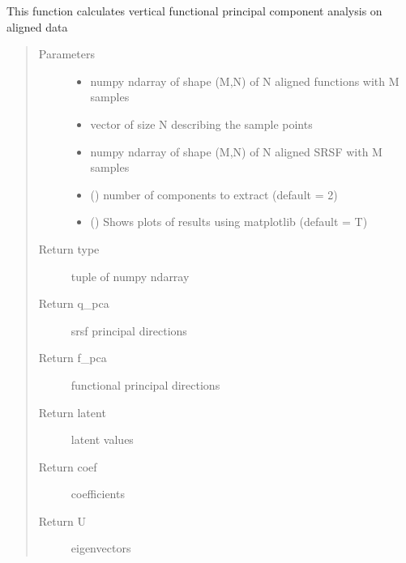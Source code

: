 \documentclass[letterpaper,10pt,english]{sphinxmanual}
\begin{document}

\begin{fulllineitems}
\label{\detokenize{fPCA:fPCA.vertfPCA}}
This function calculates vertical functional principal component analysis
on aligned data
\begin{quote}\begin{description}
\item[{Parameters}] \leavevmode\begin{itemize}
\item {} 
 \textendash{} numpy ndarray of shape (M,N) of N aligned functions with M
samples

\item {} 
 \textendash{} vector of size N describing the sample points

\item {} 
 \textendash{} numpy ndarray of shape (M,N) of N aligned SRSF with M samples

\item {} 
 () \textendash{} number of components to extract (default = 2)

\item {} 
 () \textendash{} Shows plots of results using matplotlib (default = T)

\end{itemize}

\item[{Return type}] \leavevmode
tuple of numpy ndarray

\item[{Return q\_pca}] \leavevmode
srsf principal directions

\item[{Return f\_pca}] \leavevmode
functional principal directions

\item[{Return latent}] \leavevmode
latent values

\item[{Return coef}] \leavevmode
coefficients

\item[{Return U}] \leavevmode
eigenvectors

\end{description}\end{quote}

\end{fulllineitems}
\end{document}
